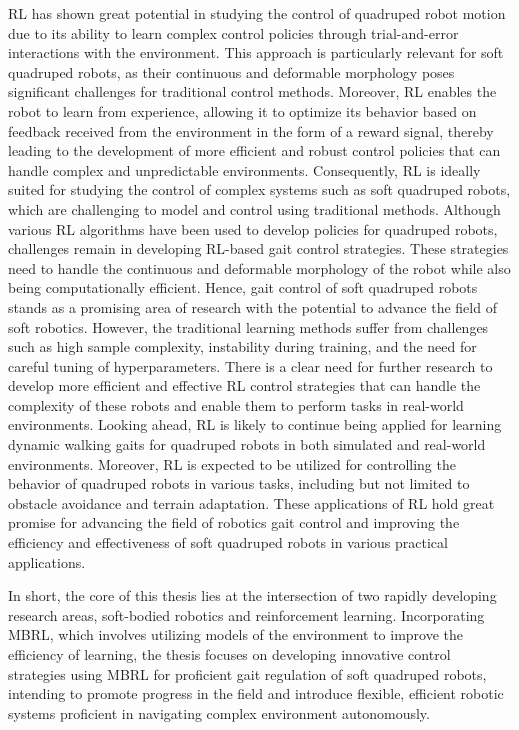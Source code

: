 \ac{RL} has shown great potential in studying the control of quadruped robot motion due to its ability to learn complex control policies through trial-and-error interactions with the environment\cite{recht2019Tour}. This approach is particularly relevant for soft quadruped robots, as their continuous and deformable morphology poses significant challenges for traditional control methods\cite{zhang2017Effective}. Moreover, \ac{RL} enables the robot to learn from experience, allowing it to optimize its behavior based on feedback received from the environment in the form of a reward signal, thereby leading to the development of more efficient and robust control policies that can handle complex and unpredictable environments\cite{ji2022Learningbased}. Consequently, \ac{RL} is ideally suited for studying the control of complex systems such as soft quadruped robots, which are challenging to model and control using traditional methods\cite{recht2019Tour}. Although various \ac{RL} algorithms have been used to develop policies for quadruped robots\cite{cebe2021Online,chignoli2021Online,chignoli2022Rapid}, challenges remain in developing RL-based gait control strategies. These strategies need to handle the continuous and deformable morphology of the robot while also being computationally efficient\cite{wang2022Efficient}.  Hence, gait control of soft quadruped robots stands as a promising area of research with the potential to advance the field of soft robotics. However, the traditional learning methods suffer from challenges such as high sample complexity\cite{haarnoja2018Soft}, instability during training\cite{zhang2021Understanding}, and the need for careful tuning of hyperparameters\cite{haarnoja2019Soft}. There is a clear need for further research to develop more efficient and effective RL control strategies that can handle the complexity of these robots and enable them to perform tasks in real-world environments\cite{annaswamy2023Adaptive}. Looking ahead, \ac{RL} is likely to continue being applied for learning dynamic walking gaits for quadruped robots in both simulated and real-world environments. Moreover, \ac{RL} is expected to be utilized for controlling the behavior of quadruped robots in various tasks, including but not limited to obstacle avoidance and terrain adaptation. These applications of \ac{RL} hold great promise for advancing the field of robotics gait control and improving the efficiency and effectiveness of soft quadruped robots in various practical applications.

In short, the core of this thesis lies at the intersection of two rapidly developing research areas, soft-bodied robotics and reinforcement learning. Incorporating \ac{MBRL}, which involves utilizing models of the environment to improve the efficiency of learning, the thesis focuses on developing innovative control strategies using \ac{MBRL} for proficient gait regulation of soft quadruped robots, intending to promote progress in the field and introduce flexible, efficient robotic systems proficient in navigating complex environment autonomously.


